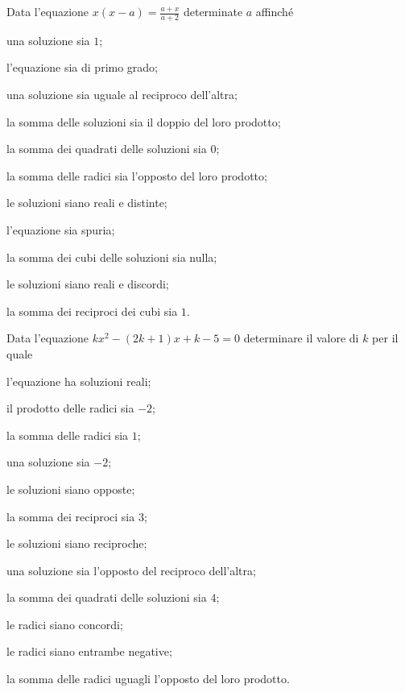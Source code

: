 \begin{esercizio}[\Ast]
 \label{ese:3.103}
Data l'equazione $x (x-a) = \frac{a + x}{a + 2}$ determinate $a$ affinché
\begin{enumeratea}
\item una soluzione sia $1$;
\item l'equazione sia di primo grado;
\item una soluzione sia uguale al reciproco dell'altra;
\item la somma delle soluzioni sia il doppio del loro prodotto;
\item la somma dei quadrati delle soluzioni sia $0$;
\item la somma delle radici sia l'opposto del loro prodotto;
\item le soluzioni siano reali e distinte;
\item l'equazione sia spuria;
\item la somma dei cubi delle soluzioni sia nulla;
\item le soluzioni siano reali e discordi;
\item la somma dei reciproci dei cubi sia $1$.
\end{enumeratea}
\end{esercizio}

\begin{esercizio}[\Ast]
 \label{ese:3.104}
Data l'equazione $kx^{2}-(2k + 1) x + k-5 = 0$ determinare il valore di $k$ per il quale
\begin{enumeratea}
\item l'equazione ha soluzioni reali;
\item il prodotto delle radici sia $-2$;
\item la somma delle radici sia $1$;
\item una soluzione sia $-2$;
\item le soluzioni siano opposte;
\item la somma dei reciproci sia $3$;
\item le soluzioni siano reciproche;
\item una soluzione sia l'opposto del reciproco dell'altra;
\item la somma dei quadrati delle soluzioni sia $4$;
\item le radici siano concordi;
\item le radici siano entrambe negative;
\item la somma delle radici uguagli l'opposto del loro prodotto.
\end{enumeratea}
\end{esercizio}

